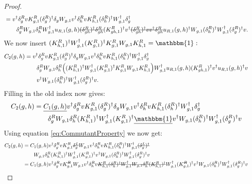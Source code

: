 \documentclass[12pt,a4paper,twoside]{article}
\newcommand{\stkout}[1]{\ifmmode\text{\sout{\ensuremath{#1}}}\else\sout{#1}\fi}
\let\originalleft\left
\let\originalright\right
\renewcommand{\left}{\mathopen{}\mathclose\bgroup\originalleft}
\renewcommand{\right}{\aftergroup\egroup\originalright}
\newcommand{\id}{\mathbbm{1}}
\theoremstyle{definition}
\numberwithin{equation}{section}
\begin{document}
\begin{proof}
\begin{align}
		&=v^\dagger \delta_g^R v K_{g,1}^R (\delta_g^R)^\dagger \delta_g W_{g,1}v^\dagger \delta_h^R v K_{h,1}^R (\delta_h^R)^\dagger W_{g,1}^\dagger \delta_g^\dagger\\
		\nonumber
		&\qquad \delta_g^R W_{g,1}\delta_h^R W_{g,1}^\dagger u_{R,1}(g,h)\stkout{(\delta_{gh}^R)^\dagger \delta_{gh}^R} (K_{gh,1}^R)^\dagger v^\dagger \stkout{(\delta_{gh}^R)^\dagger v  v^\dagger \delta^R_{gh}} u_{R,1}(g,h)^\dagger W_{g,1}(\delta^R_h)^\dagger W_{g,1}^\dagger(\delta_g^R)^\dagger v.
	\end{align}
	We now insert $(K_{h,1}^R)^\dagger W_{g,1}^\dagger (K_{g,1}^R)^\dagger K_{g,1}^R W_{g,1}K_{h,1}^R=\id:$
	\begin{align}	
		C_2(g,h)&=v^\dagger \delta_g^R v K_{g,1}^R (\delta_g^R)^\dagger \delta_g W_{g,1}v^\dagger \delta_h^R v K_{h,1}^R (\delta_h^R)^\dagger W_{g,1}^\dagger \delta_g^\dagger\\
		\nonumber
		&\qquad \delta_g^R W_{g,1}\delta_h^R \left((K_{h,1}^R)^\dagger W_{g,1}^\dagger (K_{g,1}^R)^\dagger K_{g,1}^R W_{g,1}K_{h,1}^R\right) W_{g,1}^\dagger u_{R,1}(g,h) (K_{gh,1}^R)^\dagger v^\dagger u_{R,1}(g,h)^\dagger v\\
		\nonumber
		&\qquad v^\dagger W_{g,1}(\delta^R_h)^\dagger W_{g,1}^\dagger(\delta_g^R)^\dagger v.
	\end{align}
	Filling in the old index now gives:
	\begin{align}
		C_2(g,h)&=\underline{C_1(g,h)}v^\dagger \delta_g^R v K_{g,1}^R (\delta_g^R)^\dagger \delta_g W_{g,1}v^\dagger \delta_h^R v K_{h,1}^R (\delta_h^R)^\dagger W_{g,1}^\dagger \delta_g^\dagger\\
		\nonumber
		&\qquad \delta_g^R W_{g,1}\delta_h^R (K_{h,1}^R)^\dagger W_{g,1}^\dagger (K_{g,1}^R)^\dagger \underline{\id} v^\dagger W_{g,1}(\delta^R_h)^\dagger W_{g,1}^\dagger(\delta_g^R)^\dagger v
	\end{align}
	Using equation \eqref{eq:CommutantProperty} we now get:
	\begin{align}
		C_2(g,h)&=C_1(g,h)v^\dagger \delta_g^R v K_{g,1}^R \stkout{\delta_g^L} W_{g,1}v^\dagger \delta_h^R v K_{h,1}^R (\delta_h^R)^\dagger W_{g,1}^\dagger \stkout{(\delta_g^L)^\dagger}\\
		\nonumber
		&\qquad  W_{g,1}\delta_h^R (K_{h,1}^R)^\dagger W_{g,1}^\dagger (K_{g,1}^R)^\dagger v^\dagger W_{g,1}(\delta^R_h)^\dagger W_{g,1}^\dagger(\delta_g^R)^\dagger v\\
		&=C_1(g,h)v^\dagger \delta_g^R v K_{g,1}^\stkout{R} W_{g,1}v^\dagger \delta_h^R v \stkout{K_{h,1}^R (\delta_h^R)^\dagger W_{g,1}^\dagger W_{g,1}\delta_h^R (K_{h,1}^R)^\dagger} W_{g,1}^\dagger (K_{g,1}^\stkout{R})^\dagger v^\dagger W_{g,1}(\delta^R_h)^\dagger W_{g,1}^\dagger(\delta_g^R)^\dagger v\\

\end{align}
\end{proof}
\end{document}
